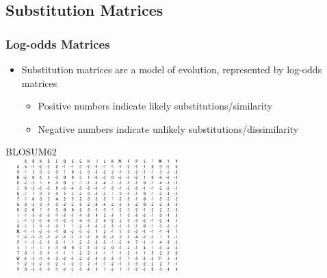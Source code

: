 \documentclass[table]{beamer}
\begin{document}
    \subsection{Substitution Matrices}

    \begin{frame}
     \frametitle{Log-odds Matrices}
     \begin{itemize}
       \item Substitution matrices are a model of evolution, represented by log-odds matrices
       \begin{itemize}
         \item Positive numbers indicate likely substitutions/similarity
         \item Negative numbers indicate unlikely substitutions/dissimilarity
       \end{itemize}
     \end{itemize}
    \begin{center}
      BLOSUM62 \\
      \includegraphics[width=0.5\textwidth]{images/blosum62} 
    \end{center}         
    \end{frame} 
\end{document}
